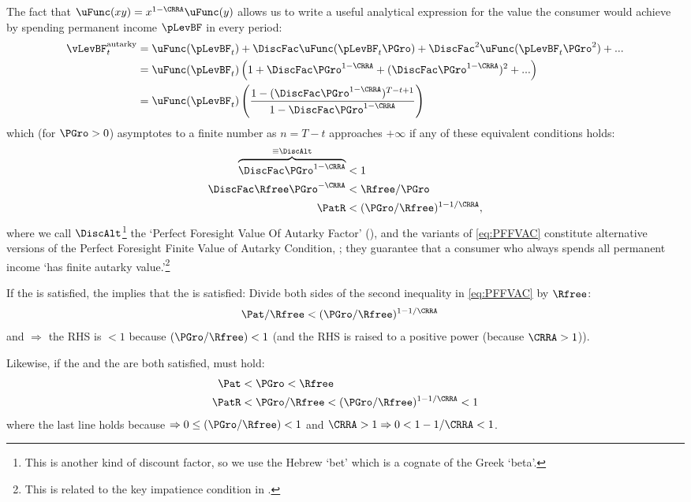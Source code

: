 \documentclass[BufferStockTheory]{subfiles}
\begin{document}
The fact that $\uFunc(xy) = x^{1-\CRRA}\uFunc(y)$ allows us to write a useful analytical expression for the value the consumer would achieve by spending permanent income $\pLevBF$ in every period:
\begin{align}
  \vLevBF_{t}^{\text{autarky}}  & = \uFunc(\pLevBF_{t})+\DiscFac \uFunc(\pLevBF_{t}\PGro)+\DiscFac^{2} \uFunc(\pLevBF_{t} \PGro^{2})+... \label{eq:ValuePFAnalyticalAutarky}
  \\  & = \uFunc(\pLevBF_{t})\left(1+\DiscFac \PGro^{1-\CRRA}+(\DiscFac \PGro^{1-\CRRA})^{2}+...\right) \notag 
  \\  & = \uFunc(\pLevBF_{t})\left(\frac{1-(\DiscFac \PGro^{1-\CRRA})^{T-t+1}}{1-\DiscFac \PGro^{1-\CRRA}}\right) \notag
\end{align}
which (for $\PGro>0$) asymptotes to a finite number as $n=T-t$ approaches $+\infty$ if any of these equivalent conditions holds:
\begin{align}
  \overbrace{\DiscFac \PGro^{1-\CRRA} }^{\equiv \DiscAlt}  & < 1  \nonumber 
  \\ \DiscFac \Rfree \PGro^{-\CRRA}  & < \Rfree/\PGro \label{eq:PFFVAC} 
  \\ \PatR    & < (\PGro/\Rfree)^{1-1/\CRRA},  \nonumber
\end{align}
where we call $\DiscAlt$\footnote{This is another kind of discount factor, so we use the Hebrew `bet' which is a cognate of the Greek `beta'.} the `Perfect Foresight Value Of Autarky Factor' ({\PFVAF}), and the variants of \eqref{eq:PFFVAC} constitute alternative versions of the Perfect Foresight Finite Value of Autarky Condition, \PFFVAC; they guarantee that a consumer who always spends all permanent income `has finite autarky value.'\footnote{This is related to the key impatience condition in \cite{asHomogeneous}.}

If the {\FHWC} is satisfied, the {\PFFVAC} implies that the {\RIC} is satisfied: Divide both sides of the second inequality in \eqref{eq:PFFVAC} by $\Rfree$:
\begin{align}
   \Pat/\Rfree & < (\PGro/\Rfree)^{1-1/\CRRA}  \label{eq:FHWCandPFFVACimplyRIC}
\end{align}
and {\FHWC} $\Rightarrow$ the RHS is $< 1$ because $(\PGro/\Rfree) < 1$ (and the RHS is raised to a positive power (because $\CRRA>1$)).

Likewise, if the {\FHWC} and the {\GIC} are both satisfied, {\PFFVAC} must hold:
\begin{align}
 \Pat & < \PGro < \Rfree \notag
\\   \PatR & < \PGro/\Rfree < (\PGro/\Rfree)^{1-1/\CRRA} < 1\label{eq:GICandFHWCimplyPFFVAC}
\end{align}
where the last line holds because {\FHWC} $\Rightarrow 0 \leq (\PGro/\Rfree) < 1$ and $\CRRA > 1 \Rightarrow 0 < 1-1/\CRRA < 1$.
\end{document}
